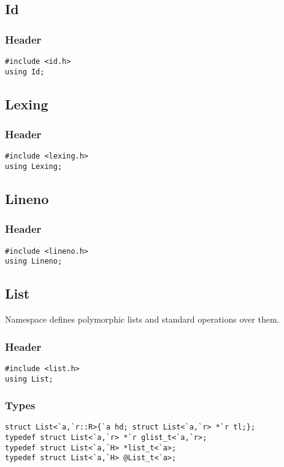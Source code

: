 \subsection{Id}

\subsubsection*{Header}
\begin{verbatim}
#include <id.h>
using Id;
\end{verbatim}

\subsection{Lexing}

\subsubsection*{Header}
\begin{verbatim}
#include <lexing.h>
using Lexing;
\end{verbatim}

\subsection{Lineno}

\subsubsection*{Header}
\begin{verbatim}
#include <lineno.h>
using Lineno;
\end{verbatim}

\subsection{List}

Namespace  defines polymorphic lists and standard operations
over them.

\subsubsection*{Header}
\begin{verbatim}
#include <list.h>
using List;
\end{verbatim}

\subsubsection*{Types}
\begin{verbatim}
struct List<`a,`r::R>{`a hd; struct List<`a,`r> *`r tl;};
typedef struct List<`a,`r> *`r glist_t<`a,`r>;
typedef struct List<`a,`H> *list_t<`a>;
typedef struct List<`a,`H> @List_t<`a>;
\end{verbatim}

